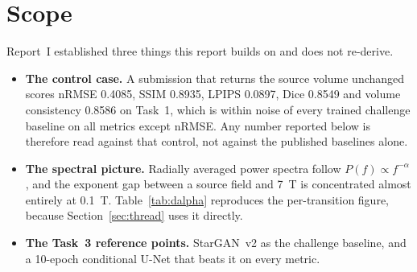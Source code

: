 \documentclass[11pt,a4paper]{article}
\newcommand{\rmse}{nRMSE}
\newcommand{\reportone}{Report~I}
\begin{document}
\begin{abstract}
We also scored a Task~3 control case, the unmodified input submitted as its own prediction. It reads
the same way \reportone{}'s Task~1 control did, and sharpens the FPS-Former result. The control loses
badly on \rmse{} (\num{0.522}) but scores SSIM \num{0.836}, \emph{beating} the challenge baseline by
\num{0.097}, and LPIPS \num{0.157}. FPS-Former therefore improves on doing nothing by \num{0.0011} of
LPIPS. Perceptual distance is where a frequency-aware model should have its advantage, and on that
metric it is indistinguishable from copying the input.
\end{abstract}

\section{Scope}
\label{sec:scope}

\reportone{} established three things this report builds on and does not re-derive.

\begin{itemize}
  \item \textbf{The control case.} A submission that returns the source volume unchanged scores
  \rmse{} \num{0.4085}, SSIM \num{0.8935}, LPIPS \num{0.0897}, Dice \num{0.8549} and volume consistency
  \num{0.8586} on Task~1, which is within noise of every trained challenge baseline on all metrics
  except \rmse{}. Any number reported below is therefore read against that control, not against the
  published baselines alone.
  \item \textbf{The spectral picture.} Radially averaged power spectra follow $P(f)\propto f^{-\alpha}$,
  and the exponent gap between a source field and \SI{7}{\tesla} is concentrated almost entirely at
  \SI{0.1}{\tesla}. Table~\ref{tab:dalpha} reproduces the per-transition figure, because
  Section~\ref{sec:thread} uses it directly.
  \item \textbf{The Task~3 reference points.} StarGAN~v2 as the challenge baseline, and a 10-epoch
  conditional U-Net that beats it on every metric.
\end{itemize}
\end{document}
